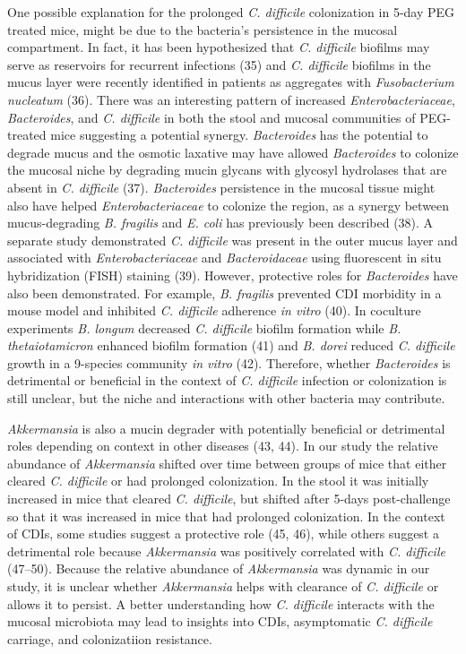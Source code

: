 \documentclass[
  11pt,
]{article}
\begin{document}
One possible explanation for the prolonged \emph{C. difficile}
colonization in 5-day PEG treated mice, might be due to the bacteria's
persistence in the mucosal compartment. In fact, it has been
hypothesized that \emph{C. difficile} biofilms may serve as reservoirs
for recurrent infections (35) and \emph{C. difficile} biofilms in the
mucus layer were recently identified in patients as aggregates with
\emph{Fusobacterium nucleatum} (36). There was an interesting pattern of
increased \emph{Enterobacteriaceae}, \emph{Bacteroides}, and \emph{C.
difficile} in both the stool and mucosal communities of PEG-treated mice
suggesting a potential synergy. \emph{Bacteroides} has the potential to
degrade mucus and the osmotic laxative may have allowed
\emph{Bacteroides} to colonize the mucosal niche by degrading mucin
glycans with glycosyl hydrolases that are absent in \emph{C. difficile}
(37). \emph{Bacteroides} persistence in the mucosal tissue might also
have helped \emph{Enterobacteriaceae} to colonize the region, as a
synergy between mucus-degrading \emph{B. fragilis} and \emph{E. coli}
has previously been described (38). A separate study demonstrated
\emph{C. difficile} was present in the outer mucus layer and associated
with \emph{Enterobacteriaceae} and \emph{Bacteroidaceae} using
fluorescent in situ hybridization (FISH) staining (39). However,
protective roles for \emph{Bacteroides} have also been demonstrated. For
example, \emph{B. fragilis} prevented CDI morbidity in a mouse model and
inhibited \emph{C. difficile} adherence \emph{in vitro} (40). In
coculture experiments \emph{B. longum} decreased \emph{C. difficile}
biofilm formation while \emph{B. thetaiotamicron} enhanced biofilm
formation (41) and \emph{B. dorei} reduced \emph{C. difficile} growth in
a 9-species community \emph{in vitro} (42). Therefore, whether
\emph{Bacteroides} is detrimental or beneficial in the context of
\emph{C. difficile} infection or colonization is still unclear, but the
niche and interactions with other bacteria may contribute.

\emph{Akkermansia} is also a mucin degrader with potentially beneficial
or detrimental roles depending on context in other diseases (43, 44). In
our study the relative abundance of \emph{Akkermansia} shifted over time
between groups of mice that either cleared \emph{C. difficile} or had
prolonged colonization. In the stool it was initially increased in mice
that cleared \emph{C. difficile}, but shifted after 5-days
post-challenge so that it was increased in mice that had prolonged
colonization. In the context of CDIs, some studies suggest a protective
role (45, 46), while others suggest a detrimental role because
\emph{Akkermansia} was positively correlated with \emph{C. difficile}
(47--50). Because the relative abundance of \emph{Akkermansia} was
dynamic in our study, it is unclear whether \emph{Akkermansia} helps
with clearance of \emph{C. difficile} or allows it to persist. A better
understanding how \emph{C. difficile} interacts with the mucosal
microbiota may lead to insights into CDIs, asymptomatic \emph{C.
difficile} carriage, and colonizatiion resistance.
\end{document}
